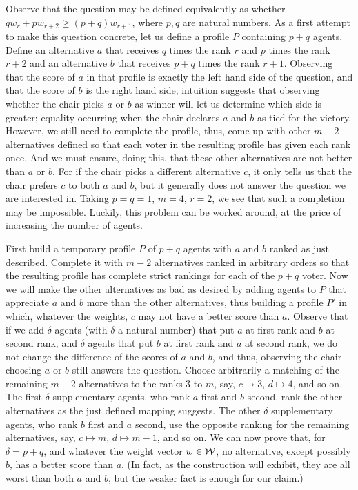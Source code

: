 Observe that the question may be defined equivalently as whether $q w_{r} + p w_{r+2} ≥ (p + q) w_{r+1}$, where $p, q$ are natural numbers. As a first attempt to make this question concrete, let us define a profile $P$ containing $p+q$ agents. Define an alternative $a$ that receives $q$ times the rank $r$ and $p$ times the rank $r+2$ and an alternative $b$ that receives $p+q$ times the rank $r+1$. Observing that the score of $a$ in that profile is exactly the left hand side of the question, and that the score of $b$ is the right hand side, intuition suggests that observing whether the chair picks $a$ or $b$ as winner will let us determine which side is greater; equality occurring when the chair declares $a$ and $b$ as tied for the victory. However, we still need to complete the profile, thus, come up with other $m-2$ alternatives defined so that each voter in the resulting profile has given each rank once. And we must ensure, doing this, that these other alternatives are not better than $a$ or $b$. For if the chair picks a different alternative $c$, it only tells us that the chair prefers $c$ to both $a$ and $b$, but it generally does not answer the question we are interested in. Taking $p = q = 1$, $m=4$, $r=2$, we see that such a completion may be impossible. Luckily, this problem can be worked around, at the price of increasing the number of agents. 

First build a temporary profile $P$ of $p+q$ agents with $a$ and $b$ ranked as just described. Complete it with $m-2$ alternatives ranked in arbitrary orders so that the resulting profile has complete strict rankings for each of the $p+q$ voter. Now we will make the other alternatives as bad as desired by adding agents to $P$ that appreciate $a$ and $b$ more than the other alternatives, thus building a profile $P'$ in which, whatever the weights, $c$ may not have a better score than $a$. Observe that if we add $\delta$ agents (with $\delta$ a natural number) that put $a$ at first rank and $b$ at second rank, and $\delta$ agents that put $b$ at first rank and $a$ at second rank, we do not change the difference of the scores of $a$ and $b$, and thus, observing the chair choosing $a$ or $b$ still answers the question. Choose arbitrarily a matching of the remaining $m-2$ alternatives to the ranks $3$ to $m$, say, $c \mapsto 3$, $d \mapsto 4$, and so on. The first $\delta$ supplementary agents, who rank $a$ first and $b$ second, rank the other alternatives as the just defined mapping suggests. The other $\delta$ supplementary agents, who rank $b$ first and $a$ second, use the opposite ranking for the remaining alternatives, say, $c \mapsto m$, $d \mapsto m-1$, and so on. We can now prove that, for $\delta = p+q$, and whatever the weight vector $w \in \mathcal{W}$, no alternative, except possibly $b$, has a better score than $a$. (In fact, as the construction will exhibit, they are all worst than both $a$ and $b$, but the weaker fact is enough for our claim.)

